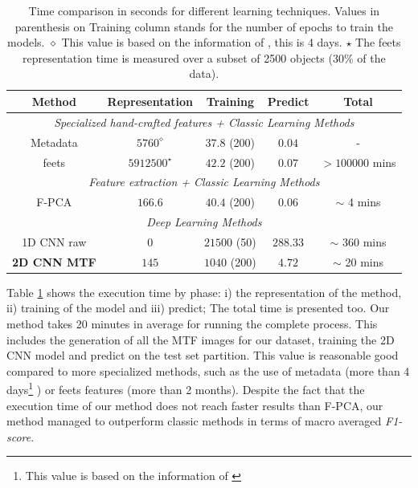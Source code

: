 \begin{table}[!t]
\caption{Time comparison in seconds for different learning techniques. Values in parenthesis on Training column stands for the number of epochs to train the models. $\diamond$ This value is based on the information of \citep{fanelli2011kepler}, this is 4 days. $\star$ The feets representation time is measured over a subset of 2500 objects (30\% of the data).}
\label{tab:time_results}
\begin{tabular}{c|ccc|c} \hline
\textbf{Method} & \textbf{Representation} & \textbf{Training} & \textbf{Predict} & \textbf{Total} \\ \hline 
\multicolumn{5}{c}{\textit{Specialized hand-crafted features + Classic Learning Methods}} \\ \hline
Metadata   & $5760^\diamond$ & $37.8$ (200)  & $0.04$ & - \\ %
feets      & $5912500^{\star}$   & $42.2$ (200)  & $0.07$ & $>100000$ mins \\ \hline %
\multicolumn{5}{c}{{\textit{Feature extraction + Classic Learning Methods}}} \\ \hline
F-PCA          & $166.6$  & $40.4$ (200) & $0.06$ & $\sim$ 4 mins \\ \hline  %
\multicolumn{5}{c}{{\textit{Deep Learning Methods}}} \\ \hline
1D CNN raw             & $0$ & $21500$ (50)  & $288.33$ & $\sim$ 360 mins  \\ 
\textbf{2D CNN MTF} 
                       & $145$ & $1040$ (200) & $4.72$ & $\sim$ 20 mins \\ %
\hline
\end{tabular}
\end{table}
Table \ref{tab:time_results} shows the execution time by phase: i) the representation of the method, ii) training of the model and iii) predict; The total time is presented too.
Our method takes 20 minutes in average for running the complete process.  This includes the generation of all the MTF images for our dataset, training the 2D CNN model and predict on the test set partition.
This value is reasonable good compared to more specialized methods, such as the use of metadata (more than 4 days\footnote{This value is based on the information of \citep{fanelli2011kepler}} ) or feets features (more than 2 months).
Despite the fact that the execution time of our method does not reach faster results than F-PCA, our method managed to outperform classic methods in terms of macro averaged \textit{F1-score}.

